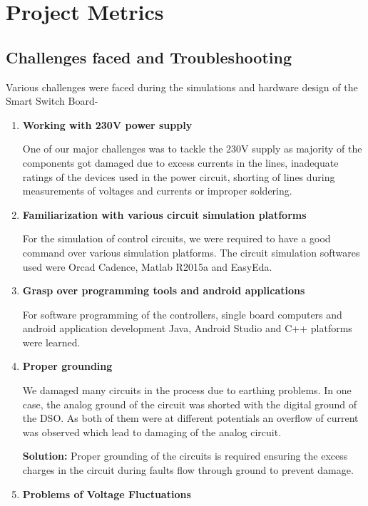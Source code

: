 \chapter{Project Metrics}
        \section{Challenges faced and Troubleshooting}
        
        Various challenges were faced during the simulations and hardware design of the Smart Switch Board-
        \begin{enumerate}
			\item \textbf{Working with 230V power supply}
			
			One of our major challenges was to tackle the 230V supply as majority of the components got damaged due to excess currents in the lines, inadequate ratings of the devices used in the power circuit, shorting of lines during measurements of voltages and currents or improper soldering.
			
			\item \textbf{Familiarization with various circuit simulation platforms}
			
			For the simulation of control circuits, we were required to have a good command over various simulation platforms. The circuit simulation softwares used were Orcad Cadence, Matlab R2015a and EasyEda.
			
			\item \textbf{Grasp over programming tools and android applications}
			
			For software programming of the controllers, single board computers and android application development Java, Android Studio and C++ platforms were learned.
			
			\item \textbf{Proper grounding}
			
			We damaged many circuits in the process due to earthing  problems. In one case, the analog ground of the circuit was shorted with the digital ground of the DSO. As both of them were at different potentials an overflow of current was observed which lead to damaging of the analog circuit.
			
			\textbf{Solution:} Proper grounding of the circuits is required ensuring the excess charges in the circuit during faults flow through ground to prevent damage.
			
			\item \textbf{Problems of Voltage Fluctuations}
			

\end{enumerate}
